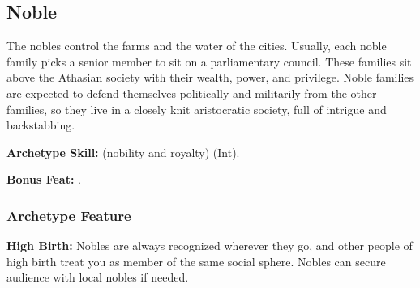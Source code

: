 \subsection{Noble}
The nobles control the farms and the water of the cities. Usually, each noble family picks a senior member to sit on a parliamentary council. These families sit above the Athasian society with their wealth, power, and privilege. Noble families are expected to defend themselves politically and militarily from the other families, so they live in a closely knit aristocratic society, full of intrigue and backstabbing.

\textbf{Archetype Skill:}  (nobility and royalty) (Int).

\textbf{Bonus Feat:} .

\subsubsection{Archetype Feature}
\textbf{High Birth:} Nobles are always recognized wherever they go, and other people of high birth treat you as member of the same social sphere. Nobles can secure audience with local nobles if needed.
